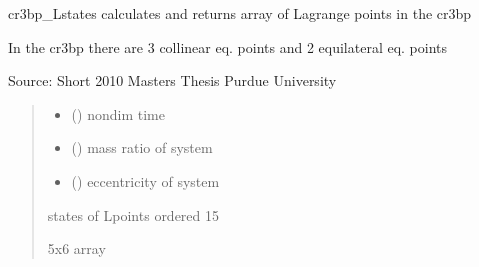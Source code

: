 \documentclass[letterpaper,10pt,english]{sphinxmanual}
\begin{document}
\begin{fulllineitems}
\label{\detokenize{models:pyraa.models.cr3bp_Lstates}}
\pysigstartsignatures
{}
\pysigstopsignatures
\sphinxAtStartPar
cr3bp\_Lstates \sphinxhyphen{} calculates and returns array of Lagrange points in the cr3bp

\sphinxAtStartPar
In the cr3bp there are 3 collinear eq. points and 2 equilateral eq. points

\sphinxAtStartPar
Source: Short 2010 Master\textquotesingle{}s Thesis Purdue University
\begin{quote}\begin{description}
\begin{itemize}
\item {} 
\sphinxAtStartPar
{} () \sphinxhyphen{}\sphinxhyphen{} non\sphinxhyphen{}dim time

\item {} 
\sphinxAtStartPar
{} () \sphinxhyphen{}\sphinxhyphen{} mass ratio of system

\item {} 
\sphinxAtStartPar
{} () \sphinxhyphen{}\sphinxhyphen{} eccentricity of system

\end{itemize}

\sphinxAtStartPar
{} \sphinxhyphen{}\sphinxhyphen{} states of Lpoints ordered 1\sphinxhyphen{}5

\sphinxAtStartPar
5x6 array

\end{description}\end{quote}

\end{fulllineitems}

\end{document}
